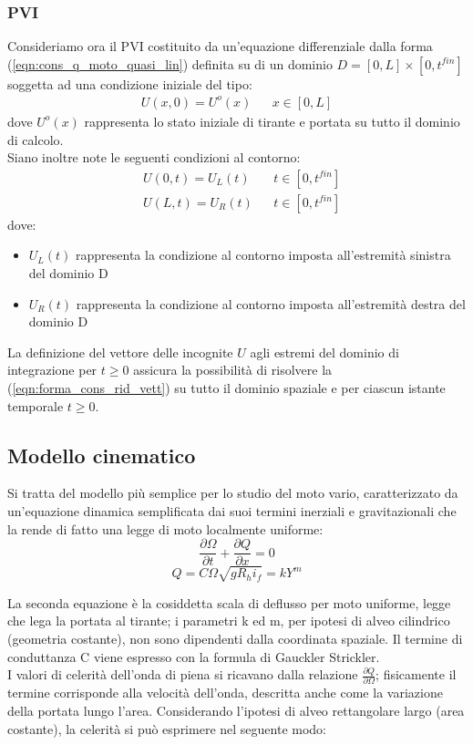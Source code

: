 \documentclass[12pt]{article} %
\begin{document}
\subsubsection{PVI}
\noindent Consideriamo ora il PVI costituito da un'equazione differenziale dalla forma (\ref{eqn:cons_q_moto_quasi_lin}) definita su di un dominio $D=[0,L]\times[0,t^{fin}]$ soggetta ad una condizione iniziale del tipo:
\begin{align}
    U(x,0) = U^o(x) && x \in [0,L]
\end{align}
\noindent dove $U^o(x)$ rappresenta lo stato iniziale di tirante e portata su tutto il dominio di calcolo.\\
\noindent Siano inoltre note le seguenti condizioni al contorno:
\begin{align}
    &U(0,t) = U_L(t) && t \in [0,t^{fin}]\\
    &U(L,t) = U_R(t) && t \in [0,t^{fin}]
\end{align}
\noindent dove:
\begin{itemize}
    \item $U_L(t)$ rappresenta la condizione al contorno imposta all'estremità sinistra del dominio D
    \item $U_R(t)$ rappresenta la condizione al contorno imposta all'estremità destra del dominio D
\end{itemize}
\noindent La definizione del vettore delle incognite $U$ agli estremi del dominio di integrazione per $t \geq 0$ assicura la possibilità di risolvere la (\ref{eqn:forma_cons_rid_vett}) su tutto il dominio spaziale e per ciascun istante temporale $t \geq 0$.

\subsection{Modello cinematico}
\noindent Si tratta del modello più semplice per lo studio del moto vario, caratterizzato da un’equazione dinamica semplificata dai suoi termini inerziali e gravitazionali che la rende di fatto una legge di moto localmente uniforme:
\begin{equation}
\frac{\partial \Omega }{\partial t}+\frac{\partial Q}{\partial x}=0
\end{equation}
\begin{equation}
Q=C\Omega\sqrt{gR_hi_f}=kY^m
\end{equation}

\noindent La seconda equazione è la cosiddetta scala di deflusso per moto uniforme, legge che lega la portata al tirante; i parametri k ed m, per ipotesi di alveo cilindrico (geometria costante), non sono dipendenti dalla coordinata spaziale.
Il termine di conduttanza C viene espresso con la formula di Gauckler Strickler.\\
I valori di celerità dell’onda di piena si ricavano dalla relazione $\frac{\partial Q}{\partial \Omega}$;
fisicamente il termine corrisponde alla velocità dell’onda, descritta anche come la variazione della portata lungo l’area.
Considerando l’ipotesi di alveo rettangolare largo (area costante), la celerità si può esprimere nel seguente modo:
\end{document}
